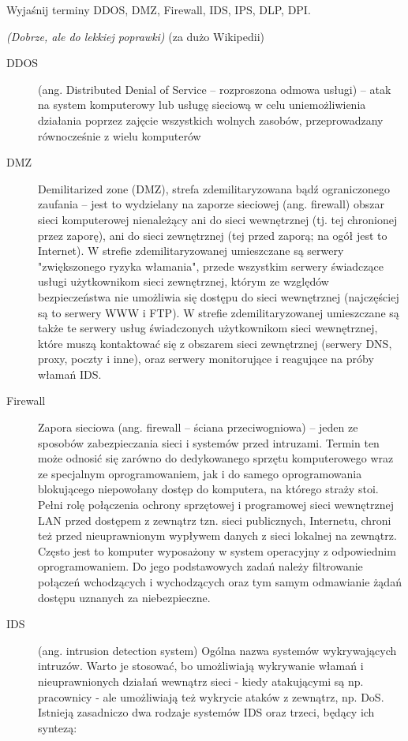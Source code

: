 \documentclass[answers,11pt]{exam}
\newcommand{\fixit}{\textit{(Dobrze, ale do lekkiej poprawki)} }
\begin{document}
\begin{questions}
\question Wyjaśnij terminy DDOS, DMZ, Firewall, IDS, IPS, DLP, DPI.
\begin{solution}
\fixit (za dużo Wikipedii)
\begin{description}
\item[DDOS] (ang. Distributed Denial of Service – rozproszona odmowa usługi) – atak na system komputerowy lub usługę sieciową w celu uniemożliwienia działania poprzez zajęcie wszystkich wolnych zasobów, przeprowadzany równocześnie z wielu komputerów
\item[DMZ]
Demilitarized zone (DMZ), strefa zdemilitaryzowana bądź ograniczonego zaufania – jest to wydzielany na zaporze sieciowej (ang. firewall) obszar sieci komputerowej nienależący ani do sieci wewnętrznej (tj. tej chronionej przez zaporę), ani do sieci zewnętrznej (tej przed zaporą; na ogół jest to Internet). W strefie zdemilitaryzowanej umieszczane są serwery "zwiększonego ryzyka włamania", przede wszystkim serwery świadczące usługi użytkownikom sieci zewnętrznej, którym ze względów bezpieczeństwa nie umożliwia się dostępu do sieci wewnętrznej (najczęściej są to serwery WWW i FTP). W strefie zdemilitaryzowanej umieszczane są także te serwery usług świadczonych użytkownikom sieci wewnętrznej, które muszą kontaktować się z obszarem sieci zewnętrznej (serwery DNS, proxy, poczty i inne), oraz serwery monitorujące i reagujące na próby włamań IDS.
\item[Firewall]
Zapora sieciowa (ang. firewall – ściana przeciwogniowa) – jeden ze sposobów zabezpieczania sieci i systemów przed intruzami.
Termin ten może odnosić się zarówno do dedykowanego sprzętu komputerowego wraz ze specjalnym oprogramowaniem, jak i do samego oprogramowania blokującego niepowołany dostęp do komputera, na którego straży stoi. Pełni rolę połączenia ochrony sprzętowej i programowej sieci wewnętrznej LAN przed dostępem z zewnątrz tzn. sieci publicznych, Internetu, chroni też przed nieuprawnionym wypływem danych z sieci lokalnej na zewnątrz. Często jest to komputer wyposażony w system operacyjny z odpowiednim oprogramowaniem. Do jego podstawowych zadań należy filtrowanie połączeń wchodzących i wychodzących oraz tym samym odmawianie żądań dostępu uznanych za niebezpieczne.
\item[IDS]
(ang. intrusion detection system) Ogólna nazwa systemów wykrywających intruzów. Warto je stosować, bo umożliwiają wykrywanie włamań i nieuprawnionych działań wewnątrz sieci - kiedy atakującymi są np. pracownicy - ale umożliwiają też wykrycie ataków z zewnątrz, np. DoS. 
Istnieją zasadniczo dwa rodzaje systemów IDS oraz trzeci, będący ich syntezą:

\end{description}
\end{solution}
\end{questions}
\end{document}
